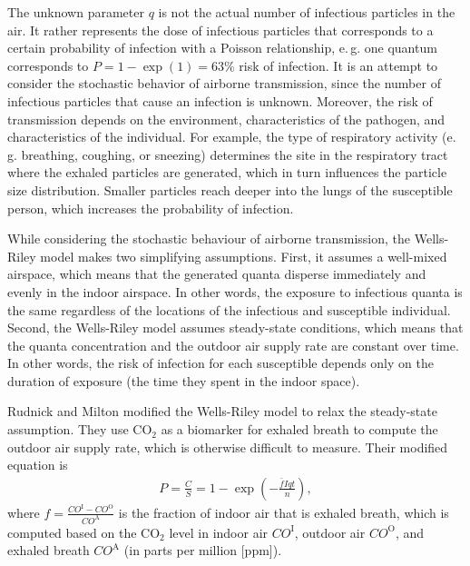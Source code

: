 \documentclass[fleqn,11pt]{wlscirep_supp}
\newcommand\eg{e.\,g.\xspace}
\begin{document}
The unknown parameter $q$ is not the actual number of infectious particles in the air. It rather represents the dose of infectious particles that corresponds to a certain probability of infection with a Poisson relationship, \eg one quantum corresponds to $P = 1 - \exp (1) = 63\%$ risk of infection\cite{Rudnick2003IndoorAir}. It is an attempt to consider the stochastic behavior of airborne transmission, since the number of infectious particles that cause an infection is unknown. Moreover, the risk of transmission depends on the environment, characteristics of the pathogen, and characteristics of the individual. For example, the type of respiratory activity (\eg breathing, coughing, or sneezing) determines the site in the respiratory tract where the exhaled particles are generated, which in turn influences the particle size distribution\cite{Wei2016AMJIC}. Smaller particles reach deeper into the lungs of the susceptible person\cite{Wang2021Science}, which increases the probability of infection. 

While considering the stochastic behaviour of airborne transmission, the Wells-Riley model makes two simplifying assumptions. First, it assumes a well-mixed airspace, which means that the generated quanta disperse immediately and evenly in the indoor airspace. In other words, the exposure to infectious quanta is the same regardless of the locations of the infectious and susceptible individual. Second, the Wells-Riley model assumes steady-state conditions, which means that the quanta concentration and the outdoor air supply rate are constant over time. In other words, the risk of infection for each susceptible depends only on the duration of exposure (the time they spent in the indoor space). 

Rudnick and Milton\cite{Rudnick2003IndoorAir} modified the Wells-Riley model to relax the steady-state assumption. They use CO$_2$ as a biomarker for exhaled breath to compute the outdoor air supply rate, which is otherwise difficult to measure. Their modified equation is
\begin{align}
    P = \frac{C}{S} = 1 - \exp \left(-\frac{\bar{f}Iqt}{n}\right),
\end{align}
where $f = \frac{CO^{\text{I}}-CO^{\text{O}}}{CO^{\text{A}}}$ is the fraction of indoor air that is exhaled breath, which is computed based on the CO$_2$ level in indoor air $CO^{\text{I}}$, outdoor air $CO^{\text{O}}$, and exhaled breath $CO^{\text{A}}$ (in parts per million [ppm]). 
\end{document}
